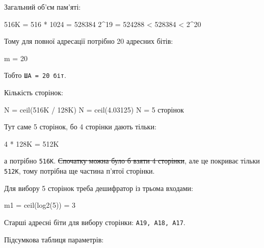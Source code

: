 \documentclass[
  11pt,
]{article}
\newenvironment{Shaded}{}{}
\newcommand{\NormalTok}[1]{#1}
\begin{document}
\begin{enumerate}
  Загальний об'єм пам'яті:

\begin{Shaded}
\begin{Highlighting}[]
\NormalTok{516K = 516 * 1024 = 528384}
\NormalTok{2\^{}19 = 524288 \textless{} 528384 \textless{} 2\^{}20}
\end{Highlighting}
\end{Shaded}

  Тому для повної адресації потрібно 20 адресних бітів:

\begin{Shaded}
\begin{Highlighting}[]
\NormalTok{m = 20}
\end{Highlighting}
\end{Shaded}

  Тобто \texttt{ША\ =\ 20\ біт}.

  Кількість сторінок:

\begin{Shaded}
\begin{Highlighting}[]
\NormalTok{N = ceil(516K / 128K)}
\NormalTok{N = ceil(4.03125)}
\NormalTok{N = 5 сторінок}
\end{Highlighting}
\end{Shaded}

  Тут саме 5 сторінок, бо 4 сторінки дають тільки:

\begin{Shaded}
\begin{Highlighting}[]
\NormalTok{4 * 128K = 512K}
\end{Highlighting}
\end{Shaded}

  а потрібно \texttt{516K}. \st{Спочатку можна було б взяти 4 сторінки}, але це покриває тільки \texttt{512K}, тому потрібна ще частина п'ятої сторінки.

  Для вибору 5 сторінок треба дешифратор із трьома входами:

\begin{Shaded}
\begin{Highlighting}[]
\NormalTok{m1 = ceil(log2(5)) = 3}
\end{Highlighting}
\end{Shaded}

  Старші адресні біти для вибору сторінки: \texttt{A19,\ A18,\ A17}.

  Підсумкова таблиця параметрів:


\end{enumerate}
\end{document}
